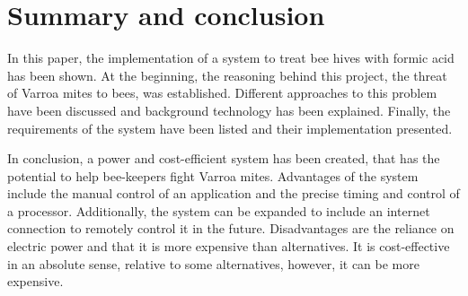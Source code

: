 \section{Summary and conclusion}\label{sec:conclusion}

In this paper, the implementation of a system to treat bee hives with formic acid has been shown.
At the beginning, the reasoning behind this project, the threat of Varroa mites to bees, was established.
Different approaches to this problem have been discussed and background technology has been explained.
Finally, the requirements of the system have been listed and their implementation presented.

In conclusion, a power and cost-efficient system has been created, that has the potential to help bee-keepers fight Varroa mites.
Advantages of the system include the manual control of an application and the precise timing and control of a processor.
Additionally, the system can be expanded to include an internet connection to remotely control it in the future.
Disadvantages are the reliance on electric power and that it is more expensive than alternatives.
It is cost-effective in an absolute sense, relative to some alternatives, however, it can be more expensive.
